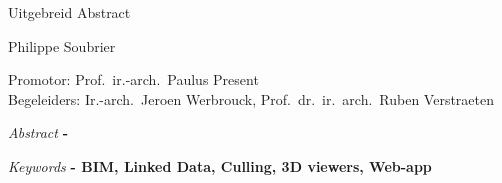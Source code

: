 \begin{center}
    \sffamily
    \huge Uitgebreid Abstract

    \Large Philippe Soubrier

    \normalsize
    Promotor: Prof.\ ir.-arch.\ Paulus Present\\
    Begeleiders: Ir.-arch.\ Jeroen Werbrouck, Prof.\ dr.\ ir.\ arch.\ Ruben Verstraeten
\end{center}
\begin{multicols}{2}
    \small
    \emph{Abstract} \textbf{
        - \lipsum[1]
    }

    \emph{Keywords} \textbf{
        - BIM, Linked Data, Culling, 3D viewers, Web-app
    }
    
    \lipsum[1-9]

\end{multicols}
\restoregeometry